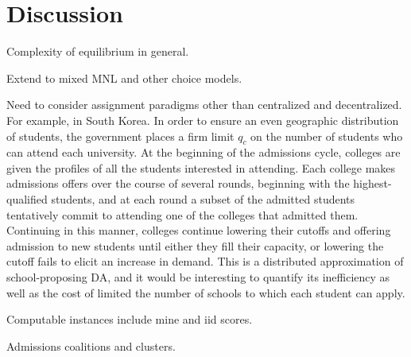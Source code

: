 \documentclass[12pt]{article}
\theoremstyle{definition}
\begin{document}
\section{Discussion}
Complexity of equilibrium in general.

Extend to mixed MNL and other choice models.

Need to consider assignment paradigms other than centralized and decentralized. For example, in South Korea. In order to ensure an even geographic distribution of students, the government places a firm limit $q_c$ on the number of students who can attend each university. At the beginning of the admissions cycle, colleges are given the profiles of all the students interested in attending. Each college makes admissions offers over the course of several rounds, beginning with the highest-qualified students, and at each round a subset of the admitted students tentatively commit to attending one of the colleges that admitted them. Continuing in this manner, colleges continue lowering their cutoffs and offering admission to new students until either they fill their capacity, or lowering the cutoff fails to elicit an increase in demand. This is a distributed approximation of school-proposing DA, and it would be interesting to quantify its inefficiency as well as the cost of limited the number of schools to which each student can apply. 

Computable instances include mine and iid scores.

Admissions coalitions and clusters. 
\pagebreak
\printbibliography
\end{document}
